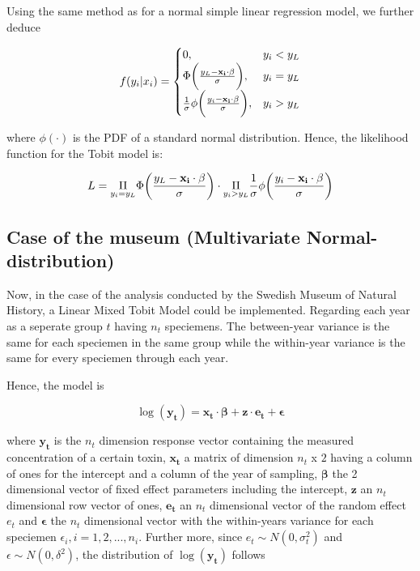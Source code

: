 \documentclass[]{article}
\begin{document}
Using the same method as for a normal simple linear regression model, we
further deduce

\[
f(y_i|x_i)= \begin{cases}
0, & y_i<y_L \\
\Phi\bigg{(}\frac{y_L-\mathbf{x_i}\cdot\mathbf{\beta}}{\sigma}\bigg{)}, & y_i=y_L \\
\frac{1}{\sigma}\phi\bigg{(}\frac{y_i-\mathbf{x_i} \cdot \mathbf{\beta}}{\sigma}\bigg{)}, & y_i>y_L
\end{cases}
\]

where \(\phi(\cdot)\) is the PDF of a standard normal distribution.
Hence, the likelihood function for the Tobit model is:

\[
L = \underset{y_i=y_L}{\Pi} \Phi\bigg{(}\frac{y_L-\mathbf{x_i}\cdot\mathbf{\beta}}{\sigma}\bigg{)} \cdot \underset{y_i>y_L}{\Pi}\frac{1}{\sigma}\phi\bigg{(}\frac{y_i-\mathbf{x_i}\cdot\mathbf{\beta}}{\sigma}\bigg{)}
\]

\subsection{Case of the museum (Multivariate
Normal-distribution)}\label{case-of-the-museum-multivariate-normal-distribution}

Now, in the case of the analysis conducted by the Swedish Museum of
Natural History, a Linear Mixed Tobit Model could be implemented.
Regarding each year as a seperate group \(t\) having \(n_t\) speciemens.
The between-year variance is the same for each speciemen in the same
group while the within-year variance is the same for every speciemen
through each year.

Hence, the model is

\[
\log(\mathbf{y_t}) = \mathbf{x_t} \cdot \mathbf{\beta} + \mathbf{z} \cdot \mathbf{e_t} + \mathbf{\epsilon}
\]

where \(\mathbf{y_t}\) is the \(n_t\) dimension response vector
containing the measured concentration of a certain toxin,
\(\mathbf{x_t}\) a matrix of dimension \(n_t\) x \(2\) having a column
of ones for the intercept and a column of the year of sampling,
\(\mathbf{\beta}\) the 2 dimensional vector of fixed effect parameters
including the intercept, \(\mathbf{z}\) an \(n_t\) dimensional row
vector of ones, \(\mathbf{e_t}\) an \(n_t\) dimensional vector of the
random effect \(e_t\) and \(\mathbf{\epsilon}\) the \(n_t\) dimensional
vector with the within-years variance for each speciemen
\(\epsilon_i, i=1,2,...,n_i\). Further more, since
\(e_t \sim N(0,\sigma_t^2)\) and \(\epsilon \sim N(0,\delta^2)\), the
distribution of \(\log(\mathbf{y_t})\) follows
\end{document}
